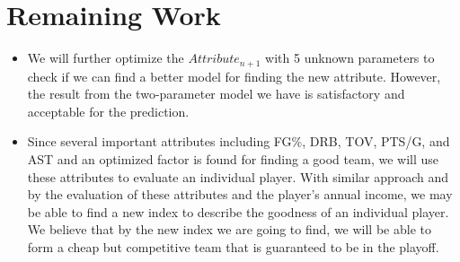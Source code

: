 \documentclass{acm_proc_article-sp}
\begin{document}
\section*{Remaining Work}
\begin{itemize}
\item We will further optimize the $Attribute_{n+1}$ with 5 unknown parameters to check if we can find a better model for finding the new attribute. However, the result from the two-parameter model we have is satisfactory and acceptable for the prediction. 
\item Since several important attributes including FG\%, DRB, TOV, PTS/G, and AST and an optimized factor is found for finding a good team, we will use these attributes to evaluate an individual player. With similar approach and by the evaluation of these attributes and the player's annual income, we may be able to find a new index to describe the goodness of an individual player. We believe that by the new index we are going to find, we will be able to form a cheap but competitive team that is guaranteed to be in the playoff. 
\end{itemize}
\end{document}
